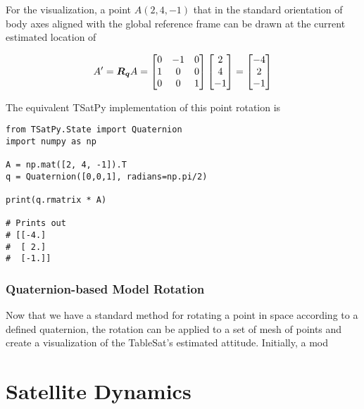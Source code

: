 For the visualization, a point $A (2, 4, -1)$ that in the standard orientation of body axes aligned with the global reference frame can be drawn at the current estimated location of

\begin{equation}
  A' = \boldsymbol{R_q} A = \begin{bmatrix} 0 & -1 & 0 \\ 1 & 0 & 0 \\ 0 & 0 & 1 \\\end{bmatrix} \begin{bmatrix} 2 \\ 4 \\ -1 \end{bmatrix} = \begin{bmatrix} -4 \\ 2 \\ -1 \end{bmatrix}
\end{equation}

The equivalent TSatPy implementation of this point rotation is

\begin{singlespace}
  \begin{verbatim}
from TSatPy.State import Quaternion
import numpy as np

A = np.mat([2, 4, -1]).T
q = Quaternion([0,0,1], radians=np.pi/2)

print(q.rmatrix * A)

# Prints out
# [[-4.]
#  [ 2.]
#  [-1.]]
  \end{verbatim}
  \nocite{minted}
\end{singlespace}


\subsubsection{Quaternion-based Model Rotation}
\label{subsubsec:QuaternionbasedModelRotation}

Now that we have a standard method for rotating a point in space according to a defined quaternion, the rotation can be applied to a set of mesh of points and create a visualization of the TableSat's estimated attitude.  Initially, a mod



\section{Satellite Dynamics}
\label{sec:SatelliteDynamics}




